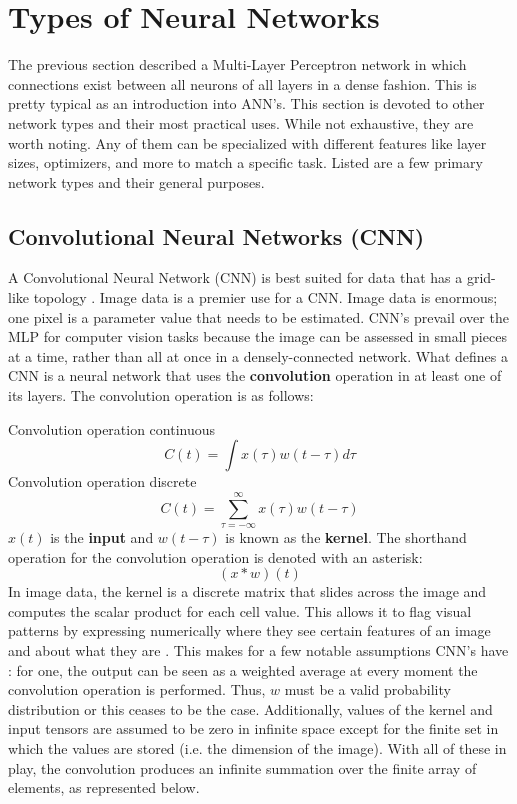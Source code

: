 
\section{Types of Neural Networks} %

The previous section described a Multi-Layer Perceptron network in which connections exist between all neurons of all layers in a dense fashion. This is pretty typical as an introduction into ANN's.
This section is devoted to other network types and their most practical uses.  While not exhaustive, they are worth noting.  Any of them can be specialized with different features like layer sizes, optimizers, and more to match a specific task.  Listed are a few primary network types and their general purposes.


\hypertarget{convolutional-neural-networks-cnn}{%
\subsection{Convolutional Neural Networks
(CNN)}\label{convolutional-neural-networks-cnn}}

A Convolutional Neural Network (CNN) is best suited for data that has a grid-like topology \cite{Goodfellow-et-al-2016}.  Image data is a premier use for a CNN.  Image data is enormous; one pixel is a parameter value that needs to be estimated. CNN's prevail over the MLP for computer vision tasks because the image can be assessed in small pieces at a time, rather than all at once in a densely-connected network.  What defines a CNN is a neural network that uses the \textbf{convolution} operation in at least one of its layers.  The convolution operation is as follows:

Convolution operation continuous \[
C(t) = \int x(\tau)w(t - \tau)d\tau
\] Convolution operation discrete \[
C(t) = \sum_{\tau = -\infty}^\infty x(\tau)w(t - \tau)
\] \(x(t)\) is the \textbf{input} and \(w(t-\tau)\) is known as the
\textbf{kernel}. The shorthand operation for the convolution operation
is denoted with an asterisk: \[
(x * w)(t)
\]
In image data, the kernel is a discrete matrix that slides across the image and computes the scalar product for each cell value.  This allows it to flag visual patterns by expressing numerically where they see certain features of an image and about what they are \cite{o2015introduction}.
This makes for a few notable assumptions CNN's have \cite{Goodfellow-et-al-2016}: for one, the output can be seen as a weighted average at every moment the convolution operation is performed.  Thus, $w$ must be a valid probability distribution or this ceases to be the case.  Additionally, values of the kernel and input tensors are assumed to be zero in infinite space except for the finite set in which the values are stored (i.e. the dimension of the image).  With all of these in play, the convolution produces an infinite summation over the finite array of elements, as represented below.


